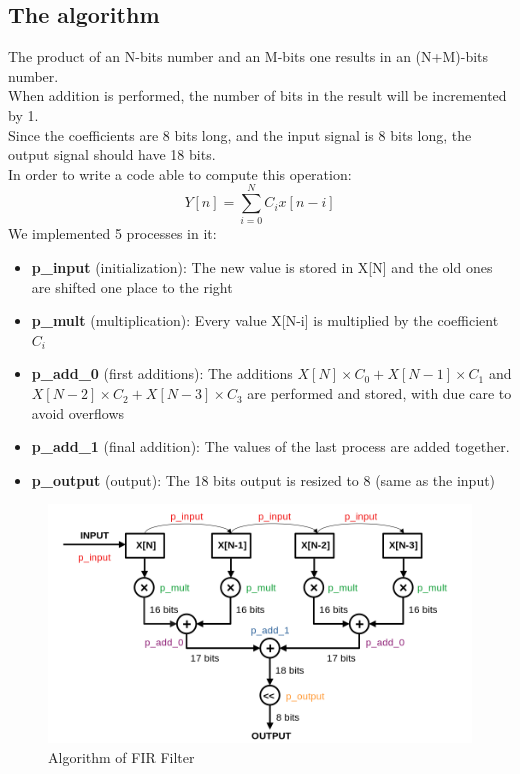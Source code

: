\documentclass[11pt,a4paper,twocolumn]{IEEEtran}
\begin{document}
	\subsection*{The algorithm}
	The product of an N-bits number and an M-bits one results in an (N+M)-bits number.\\
	When addition is performed, the number of bits in the result will be incremented by 1.\\
	Since the coefficients are 8 bits long, and the input signal is 8 bits long, the output signal should have 18 bits.\\
	In order to write a code able to compute this operation:
	$$ Y[n] = \sum_{i=0}^N C_i x[n-i] $$
	We implemented 5 processes in it:
	\begin{itemize}
	\item\textbf{p\_input} (initialization): The new value is stored in X[N] and the old ones are shifted one place to the right
	\item\textbf{p\_mult} (multiplication): Every value X[N-i] is multiplied by the coefficient $C_i$
	\item\textbf{p\_add\_0} (first additions): The additions $X[N]\times C_0 + X[N-1]\times C_1$ and $X[N-2]\times C_2 + X[N-3]\times C_3$ are performed and stored, with due care to avoid overflows
	\item\textbf{p\_add\_1} (final addition): The values of the last process are added together.
	\item\textbf{p\_output} (output): The 18 bits output is resized to 8 (same as the input)
	\end{itemize}
\begin{figure}[h]
	\hspace*{-1cm}
	\includegraphics[width=1.2\linewidth]{img/firalg1}
	\caption{Algorithm of FIR Filter}
\end{figure}
\end{document}
